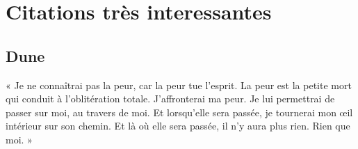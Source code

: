 \chapter{Citations très interessantes}
    \section{Dune}
        « Je ne connaîtrai pas la peur, car la peur tue l'esprit. La peur est la petite mort qui conduit à l'oblitération totale. J'affronterai ma peur. Je lui permettrai de passer sur moi, au travers de moi. Et lorsqu'elle sera passée, je tournerai mon œil intérieur sur son chemin. Et là où elle sera passée, il n'y aura plus rien. Rien que moi. »